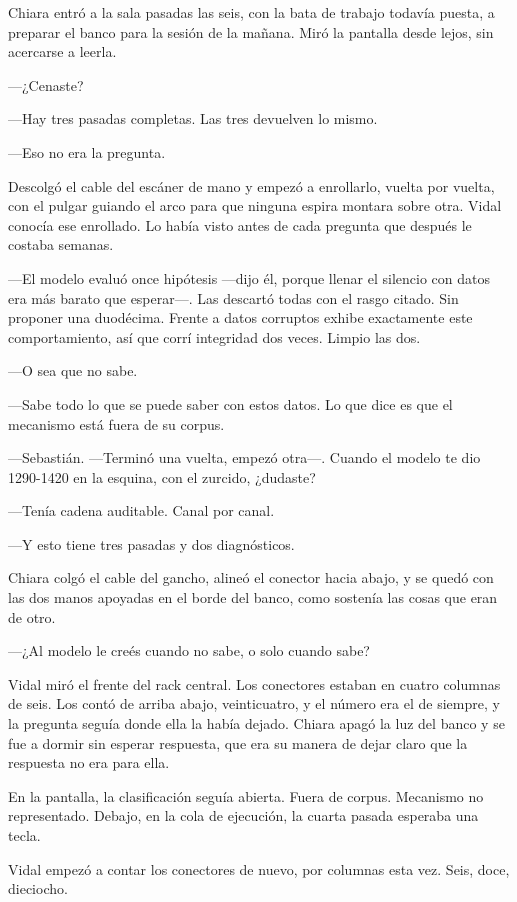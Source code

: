Chiara entró a la sala pasadas las seis, con la bata de trabajo todavía puesta, a preparar el banco para la sesión de la mañana. Miró la pantalla desde lejos, sin acercarse a leerla.

---¿Cenaste?

---Hay tres pasadas completas. Las tres devuelven lo mismo.

---Eso no era la pregunta.

Descolgó el cable del escáner de mano y empezó a enrollarlo, vuelta por vuelta, con el pulgar guiando el arco para que ninguna espira montara sobre otra. Vidal conocía ese enrollado. Lo había visto antes de cada pregunta que después le costaba semanas.

---El modelo evaluó once hipótesis ---dijo él, porque llenar el silencio con datos era más barato que esperar---. Las descartó todas con el rasgo citado. Sin proponer una duodécima. Frente a datos corruptos exhibe exactamente este comportamiento, así que corrí integridad dos veces. Limpio las dos.

---O sea que no sabe.

---Sabe todo lo que se puede saber con estos datos. Lo que dice es que el mecanismo está fuera de su corpus.

---Sebastián. ---Terminó una vuelta, empezó otra---. Cuando el modelo te dio 1290-1420 en la esquina, con el zurcido, ¿dudaste?

---Tenía cadena auditable. Canal por canal.

---Y esto tiene tres pasadas y dos diagnósticos.

Chiara colgó el cable del gancho, alineó el conector hacia abajo, y se quedó con las dos manos apoyadas en el borde del banco, como sostenía las cosas que eran de otro.

---¿Al modelo le creés cuando no sabe, o solo cuando sabe?

Vidal miró el frente del rack central. Los conectores estaban en cuatro columnas de seis. Los contó de arriba abajo, veinticuatro, y el número era el de siempre, y la pregunta seguía donde ella la había dejado. Chiara apagó la luz del banco y se fue a dormir sin esperar respuesta, que era su manera de dejar claro que la respuesta no era para ella.

En la pantalla, la clasificación seguía abierta. Fuera de corpus. Mecanismo no representado. Debajo, en la cola de ejecución, la cuarta pasada esperaba una tecla.

Vidal empezó a contar los conectores de nuevo, por columnas esta vez. Seis, doce, dieciocho.

